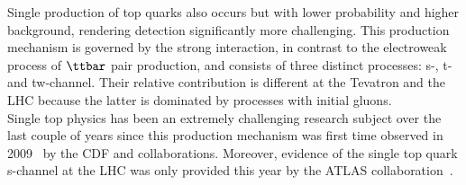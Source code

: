 Single production of top quarks also occurs but with lower probability and higher background, rendering detection significantly more challenging.
This production mechanism is governed by the strong interaction, in contrast to the electroweak process of $\ttbar$ pair production, and consists of three distinct processes: s-, t- and tw-channel.
Their relative contribution is different at the Tevatron and the LHC because the latter is dominated by processes with initial gluons. %
\\
Single top physics has been an extremely challenging research subject over the last couple of years since this production mechanism was first time observed in 2009~\cite{STDiscovery1, STDiscovery2} by the CDF and \DZ collaborations. Moreover, evidence of the single top quark s-channel at the LHC was only provided this year by the ATLAS collaboration~\cite{AtlasSTsChEvidence}.
